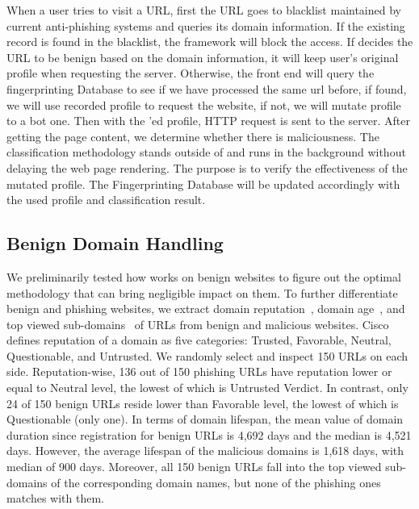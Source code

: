 When a user tries to visit a URL, first the URL goes to blacklist maintained by current anti-phishing systems and \spartacus queries its domain information.
If the existing record is found in the blacklist, the framework will block the access. 
If \spartacus decides the URL to be benign based on the domain information, it will keep user's original profile when requesting the server. 
Otherwise, the front end will query the fingerprinting Database to see if we have processed the same url before, if found, we will use recorded profile to request the website, if not, we will mutate profile to a bot one. Then with the \spartacus'ed profile, HTTP request is sent to the server. After getting the page content, we determine whether there is maliciousness.
The classification methodology stands outside of \spartacus and runs in the background without delaying the web page rendering.
The purpose is to verify the effectiveness of the mutated profile.
The Fingerprinting Database will be updated accordingly with the used profile and classification result.


\subsection{Benign Domain Handling}
\label{ss:benignalg}


We preliminarily tested how \spartacus works on benign websites to figure out the optimal methodology that can bring negligible impact on them.
To further differentiate benign and phishing websites,
we extract domain reputation~\cite{reputation}, domain age~\cite{whois}, and top viewed sub-domains~\cite{topviewedsubdomains} of URLs from benign and malicious websites.
Cisco defines reputation of a domain as five categories: Trusted, Favorable, Neutral, Questionable, and Untrusted.
We randomly select and inspect 150 URLs on each side.
Reputation-wise, 136 out of 150 phishing URLs have reputation lower or equal to Neutral level, the lowest of which is Untrusted Verdict.
In contrast, only 24 of 150 benign URLs reside lower than Favorable level, the lowest of which is Questionable (only one).
In terms of domain lifespan, the mean value of domain duration since registration for benign URLs is 4,692 days and the median is 4,521 days.
However, the average lifespan of the malicious domains is 1,618 days, with median of 900 days.
Moreover, all 150 benign URLs fall into the top viewed sub-domains of the corresponding domain names, but none of the phishing ones matches with them.

